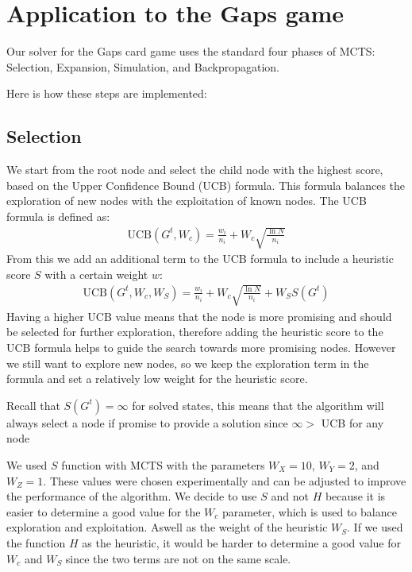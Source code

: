 
\section{Application to the Gaps game}
Our solver for the Gaps card game uses the standard four phases of MCTS: Selection, Expansion, Simulation, and Backpropagation.

Here is how these steps are implemented:
\subsection{Selection}
We start from the root node and select the child node with the highest score, based on the Upper Confidence Bound (UCB) formula. This formula balances the exploration of new nodes with the exploitation of known nodes. The UCB formula is defined as:
\begin{align*}
    \text{UCB}(G^t, W_c) = \frac{w_i}{n_i} + W_c \sqrt{\frac{\ln{N}}{n_i}}
\end{align*}
From this we add an additional term to the UCB formula to include a heuristic score $S$ with a certain weight $w$:
\begin{align*}
    \text{UCB}(G^t, W_c, W_S) = \frac{w_i}{n_i} + W_c \sqrt{\frac{\ln{N}}{n_i}} + W_SS(G^t)
\end{align*}
Having a higher UCB value means that the node is more promising and should be selected for further exploration, therefore adding the heuristic score to the UCB formula helps to guide the search towards more promising nodes. However we still want to explore new nodes, so we keep the exploration term in the formula and set a relatively low weight for the heuristic score.

Recall that $S\left(G^t\right)=\infty$ for solved states, this means that the algorithm will always select a node if promise to provide a solution since $\infty >$ UCB for any node

We used $S$ function with MCTS with the parameters $W_X = 10$, $W_Y = 2$, and $W_Z = 1$. These values were chosen experimentally and can be adjusted to improve the performance of the algorithm. We decide to use $S$ and not $H$ because it is easier to determine a good value for the $W_c$ parameter, which is used to balance exploration and exploitation. Aswell as the weight of the heuristic $W_S$. If we used the function $H$ as the heuristic, it would be harder to determine a good value for $W_c$ and $W_S$ since the two terms are not on the same scale.

